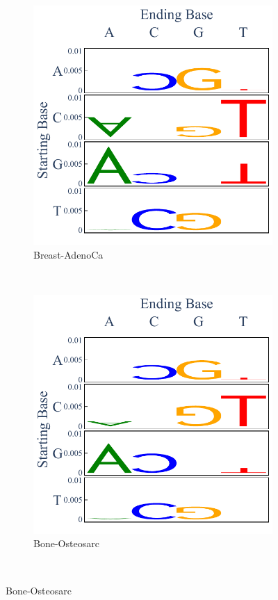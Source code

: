 \begin{figure}[h!]
    \begin{subfigure}{.5\textwidth}
    \centering
    \includegraphics[scale=0.45]{graphics/spectra_Breast-AdenoCa.pdf}
    \caption{Breast-AdenoCa}
    \end{subfigure}
    ~
    \begin{subfigure}{.5\textwidth}
    \centering
    \includegraphics[scale=0.45]{graphics/spectra_Bone-Osteosarc.pdf}
    \caption{Bone-Osteosarc}
    \end{subfigure} \\
    

\end{figure}
